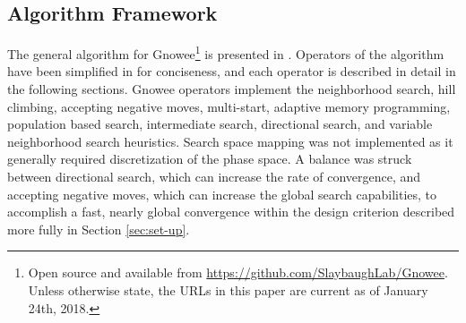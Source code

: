 \documentclass{article}                                                                           %
\begin{document}
\subsection{Algorithm Framework}
The general algorithm for Gnowee\footnote{Open source and available from \url{https://github.com/SlaybaughLab/Gnowee}. Unless otherwise state, the URLs in this paper are current as of January 24th, 2018.} is presented in .
Operators of the algorithm have been simplified in   for conciseness, and each operator is described in detail in the following sections.
Gnowee operators implement the neighborhood search, hill climbing, accepting negative moves, multi-start, adaptive memory programming, population based search, intermediate search, directional search, and variable neighborhood search heuristics.
Search space mapping was not implemented as it generally required  discretization of the phase space.  
A balance was struck between directional search, which can increase the rate of convergence, and accepting negative moves, which can increase the global search capabilities, to accomplish a fast, nearly global convergence within the design criterion described more fully in Section \ref{sec:set-up}.  
\end{document}
